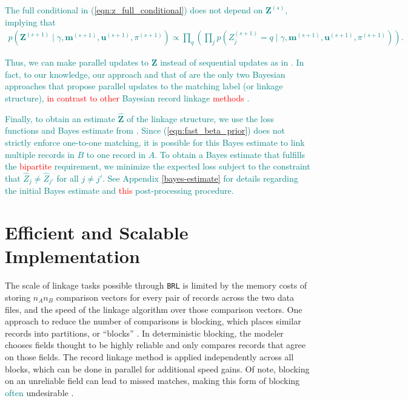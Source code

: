 \documentclass[ba]{imsart}
\begin{document}
\textcolor{teal}{
The full conditional in (\ref{eqn:z_full_conditional}) does not depend on $\bm{Z}^{(s)},$ implying that 
\begin{align}
p(\bm{Z}^{(s+1)} \mid \gamma, \bm{m}^{(s+1)}, \bm{u}^{(s+1)}, \pi^{(s+1)}) \propto \prod_q \left(\prod_j
p\left(Z_j^{(s+1)}  = q \mid \gamma, \bm{m}^{(s+1)}, \bm{u}^{(s+1)}, \pi^{(s+1)} \right)
\right).
\end{align}
}

\textcolor{teal}{Thus, we can make parallel updates to $\bm{Z}$ instead of sequential updates as in \cite{sadinle_bayesian_2017}.
In fact, to our knowledge, our approach and that of \cite{wortman2019} are the only two Bayesian approaches that propose parallel updates to the matching label (or linkage structure), \textcolor{red}{in contrast to} \textcolor{red}{other} Bayesian record linkage \textcolor{red}{methods} \citep{tancredi2011hierarchical, sadinle_detecting_2014, steorts_bayesian_2016, marchant_distributed_2019, zanella_flexible_2016, betancourt2022prior, aleshinguendel2021multifile}. }


\textcolor{teal}{Finally, to obtain an estimate $\hat{\bm{Z}}$ of the linkage structure, we use the loss functions and Bayes estimate from \cite{sadinle_bayesian_2017}. Since (\ref{eqn:fast_beta_prior}) does not strictly enforce one-to-one matching, it is possible for this Bayes estimate to link multiple records in $B$ to one record in $A$. To obtain a Bayes estimate that fulfills the \textcolor{red}{bipartite} requirement, we minimize the expected loss subject to the constraint that $\hat{Z}_j \neq \hat{Z}_{j'}$ for all $j \neq j'$. See Appendix \ref{bayes-estimate} for details regarding the initial Bayes estimate and \textcolor{red}{this} post-processing procedure.}


\section{Efficient and Scalable Implementation}
\label{sec:efficiency}

The scale of linkage tasks possible through \texttt{BRL} is limited by the memory costs of storing $n_A  n_B$ comparison vectors for every pair of records across the two data files, and the speed of the linkage algorithm over those comparison vectors. One approach to reduce the number of comparisons is blocking, which places similar records into partitions, or ``blocks'' \citep{christen2019data}. In deterministic blocking, the modeler chooses fields thought to be highly reliable and only compares records that agree on those fields. The record linkage method is  applied independently across all blocks, which can be done in parallel for additional speed gains. Of note, blocking on an unreliable field can lead to missed matches, making this form of blocking \textcolor{teal}{often}
 undesirable %
\citep{steorts_comparison_2014}.
\end{document}
